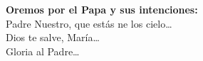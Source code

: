 \textbf{Oremos por el Papa y sus intenciones:}\\
Padre Nuestro, que estás ne los cielo\ldots\\
Dios te salve, María\ldots\\
Gloria al Padre\ldots